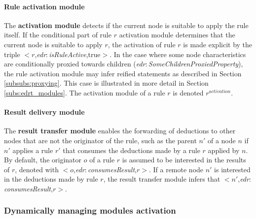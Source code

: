 \documentclass{iosart2c}
\newcommand{\namespace}[1]{\textit{#1$:$}}
\newcommand{\concept}[2]{\namespace{#1}\-\textit{#2}}
\newcommand{\triplet}[3]{$<$#1,\textit{#2},#3$>$}
\begin{document}
\paragraph{Rule activation module}
The \textbf{activation module} detects if the current node is suitable to apply the rule itself. 
If the conditional part of rule $r$ activation module determines that the current node is suitable to apply $r$, the activation of rule $r$ is made explicit by the triple \triplet{$r$}{\concept{edr}{is\-Rule\-Active}}{true}.
In the case where some node characteristics are conditionally proxied towards children (\concept{edr}{Some\-Children\-Proxied\-Property}), the rule activation module may infer reified statements as described in Section \textsection \ref{subsubs:proxying}. 
This case is illustrated in more detail in Section \textsection \ref{subs:edrt_modules}.
The activation module of a rule $r$ is denoted $r^{activation}$.

\paragraph{Result delivery module}
The \textbf{result transfer module} enables the forwarding of deductions to other nodes that are not the originator of the rule, such as the parent $n'$ of a node $n$ if $n'$ applies a rule $r'$ that consumes the deductions made by a rule $r$ applied by $n$.
By default, the originator $o$ of a rule $r$ is assumed to be interested in the results of $r$, denoted with \triplet{$o$}{\concept{edr}{consumes\-Result}}{$r$}.
If a remote node $n'$ is interested in the deductions made by rule $r$, the result transfer module infers that \triplet{$n'$}{\concept{edr}{consumes\-Result}}{$r$}.

%	


\subsubsection{Dynamically managing modules activation}
\end{document}

